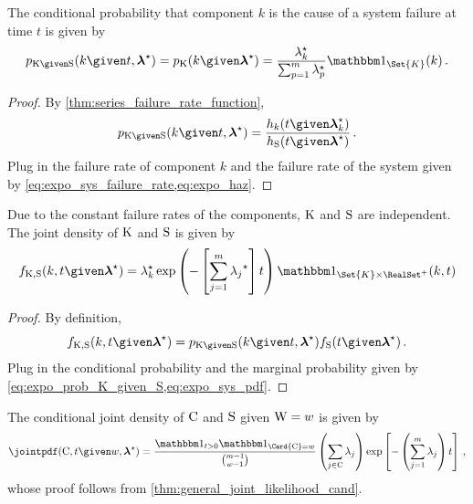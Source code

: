 \documentclass[../main.tex]{subfiles}
\begin{document}
The conditional probability that component $k$ is the cause of a system failure at time $t$ is given by
\begin{equation}
\label{eq:expo_prob_K_given_S}
    \pmf_{\RV{K} \given \sv}(k \given t, \tparam{\vec\lambda}) = \pmf_{\RV{K}}(k \given \tparam{\vec\lambda}) =
        \frac{\tparam{\lambda}_k}{\sum_{p=1}^{m} 
        \tparam{\lambda}_p}\SetIndicator{\Set{K}}(k)\,.
\end{equation}
\begin{proof}
By \cref{thm:series_failure_rate_function},
\begin{equation}
\pmf_{\RV{K} \given \sv}(k \given t, \tparam{\vec\lambda}) = \frac
    {\haz_k(t \given \tparam{\vec\lambda}_k)}
    {\haz_{\sv}(t \given \tparam{\vec\lambda})}\,.
\end{equation}
Plug in the failure rate of component $k$ and the failure rate of the system given by \cref{eq:expo_sys_failure_rate,eq:expo_haz}.
\end{proof}
Due to the constant failure rates of the components, $\mathrm{K}$ and $\mathrm{S}$ are independent. The joint density of $\mathrm{K}$ and $\mathrm{S}$ is given by
\begin{equation}
\label{eq:expo_joint_k_s}
\pdf_{\RV{K}, \sv}(k, t \given \tparam{\vec\lambda}) =
    \tparam{\lambda}_k \exp \left(-\left [ \sum_{j=1}^{m}{\tparam{\lambda_j}} \right ] t\right)
    \SetIndicator{\Set{K} \times \RealSet^{+}}(k,t)
\end{equation}
\begin{proof}
By definition,
\begin{equation}
\pdf_{\RV{K}, \sv}(k, t \given \tparam{\vec\lambda}) =
    \pmf_{\RV{K} \given \sv}(k \given t, \tparam{\vec\lambda}) \spdf(t \given \tparam{\vec\lambda})\,.
\end{equation}
Plug in the conditional probability and the marginal probability given by \cref{eq:expo_prob_K_given_S,eq:expo_sys_pdf}.
\end{proof}

The conditional joint density of $\mathrm{C}$ and $\mathrm{S}$ given $\mathrm{W} = w$ is given by
\begin{equation}
    \jointpdf(\cand, t \given w, \tparam{\vec\lambda}) = \frac{\SetIndicator{t > 0} \SetIndicator{\Card{\cand} = w}}{\binom{m-1}{w-1}} \left ( \sum_{j \in \cand} \lambda_j \right ) \exp \left [ - \left ( \sum_{j=1}^{m} \lambda_j \right ) t \right ]\,,
\end{equation}
whose proof follows from \cref{thm:general_joint_likelihood_cand}.
\end{document}
